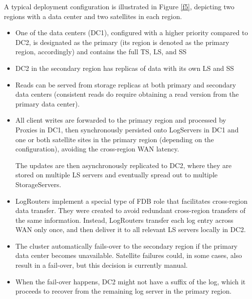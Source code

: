 \documentclass[11pt]{article}
\begin{document}
A typical deployment configuration is illustrated in Figure \ref{f5}, depicting two regions with a data
center and two satellites in each region.
\begin{itemize}
\item One of the data centers (DC1), configured with a higher priority compared to DC2, is designated as
the primary (its region is denoted as the primary region, accordingly) and contains the full TS, LS,
and SS
\item DC2 in the secondary region has replicas of data with its own LS and SS
\item Reads can be served from storage replicas at both primary and secondary data centers (consistent
reads do require obtaining a read version from the primary data center).
\item All client writes are forwarded to the primary region and processed by Proxies in DC1, then
synchronously persisted onto LogServers in DC1 and one or both satellite sites in the primary region
(depending on the configuration), avoiding the cross-region WAN latency.

The updates are then asynchronously replicated to DC2, where they are stored on multiple LS servers
and eventually spread out to multiple StorageServers.
\item LogRouters implement a special type of FDB role that facilitates cross-region data transfer. They
were created to avoid redundant cross-region transfers of the same information. Instead, LogRouters
transfer each log entry across WAN only once, and then deliver it to all relevant LS servers locally in DC2.
\end{itemize}


\begin{itemize}
\item The cluster automatically fails-over to the secondary region if the primary data center becomes
unavailable. Satellite failures could, in some cases, also result in a fail-over, but this decision
is currently manual.
\item When the fail-over happens, DC2 might not have a suffix of the log, which it proceeds to recover
from the remaining log server in the primary region.
\end{itemize}
\end{document}
